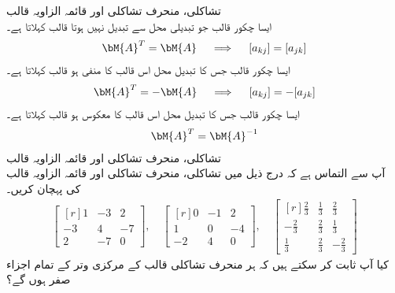 \quad تشاکلی، منحرف تشاکلی اور قائمہ الزاویہ قالب\\
ایسا  چکور قالب  جو تبدیلی محل سے  تبدیل نہیں ہوتا  قالب کہلاتا ہے۔
\begin{align}\label{مساوات_امتیازی_تشاکل_منحرف_تشاکل_قائمہ_الف}
\bM{A}^T=\bM{A} \quad \implies \quad [a_{kj}]=[a_{jk}]
\end{align}
ایسا  چکور قالب  جس کا تبدیل محل اس قالب کا منفی  ہو  قالب کہلاتا ہے۔
\begin{align}\label{مساوات_امتیازی_تشاکل_منحرف_تشاکل_قائمہ_ب}
\bM{A}^T=-\bM{A}\quad \implies \quad [a_{kj}]=-[a_{jk}]
\end{align}
ایسا  چکور قالب  جس کا تبدیل محل اس  قالب کا معکوس ہو   قالب کہلاتا ہے۔
\begin{align}\label{مساوات_امتیازی_تشاکل_منحرف_تشاکل_قائمہ_پ}
\bM{A}^T=\bM{A}^{-1}
\end{align}
\quad تشاکلی، منحرف تشاکلی اور قائمہ الزاویہ قالب\\
آپ سے التماس ہے کہ درج ذیل میں تشاکلی، منحرف تشاکلی اور قائمہ الزاویہ قالب کی پہچان کریں۔
\begin{align*}
\begin{bmatrix*}[r] 1&-3&2\\-3&4&-7\\2&-7&0 \end{bmatrix*},\quad \begin{bmatrix*}[r] 0&-1&2\\1&0&-4\\-2&4&0 \end{bmatrix*},\quad
\begin{bmatrix*}[r] \tfrac{2}{3}&\tfrac{1}{3}&\tfrac{2}{3}\\-\tfrac{2}{3}&\tfrac{2}{3}&\tfrac{1}{3}\\ \tfrac{1}{3}&\tfrac{2}{3}&-\tfrac{2}{3} \end{bmatrix*}
\end{align*}
کیا آپ ثابت کر سکتے ہیں کہ ہر منحرف تشاکلی قالب کے مرکزی وتر کے تمام اجزاء صفر ہوں گے؟

